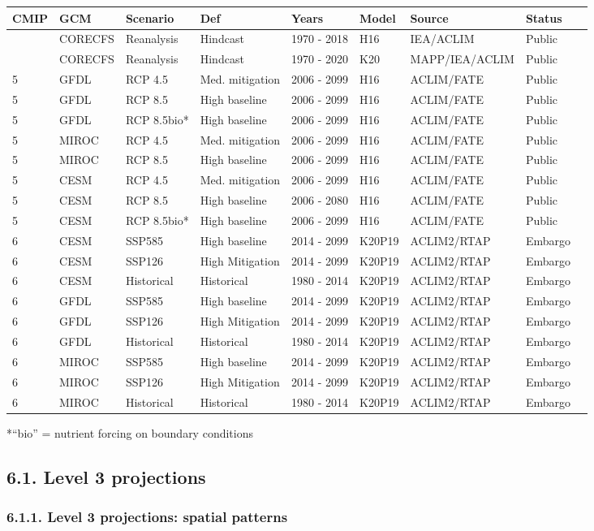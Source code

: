 \documentclass[
]{article}
\begin{document}
\begin{longtable}[]{@{}lllllllll@{}}
\toprule
CMIP & GCM & Scenario & Def & Years & Model & Source & Status
&\tabularnewline
\midrule
\endhead
& CORECFS & Reanalysis & Hindcast & 1970 - 2018 & H16 & IEA/ACLIM &
Public &\tabularnewline
& CORECFS & Reanalysis & Hindcast & 1970 - 2020 & K20 & MAPP/IEA/ACLIM &
Public &\tabularnewline
5 & GFDL & RCP 4.5 & Med. mitigation & 2006 - 2099 & H16 & ACLIM/FATE &
Public &\tabularnewline
5 & GFDL & RCP 8.5 & High baseline & 2006 - 2099 & H16 & ACLIM/FATE &
Public &\tabularnewline
5 & GFDL & RCP 8.5bio* & High baseline & 2006 - 2099 & H16 & ACLIM/FATE
& Public &\tabularnewline
5 & MIROC & RCP 4.5 & Med. mitigation & 2006 - 2099 & H16 & ACLIM/FATE &
Public &\tabularnewline
5 & MIROC & RCP 8.5 & High baseline & 2006 - 2099 & H16 & ACLIM/FATE &
Public &\tabularnewline
5 & CESM & RCP 4.5 & Med. mitigation & 2006 - 2099 & H16 & ACLIM/FATE &
Public &\tabularnewline
5 & CESM & RCP 8.5 & High baseline & 2006 - 2080 & H16 & ACLIM/FATE &
Public &\tabularnewline
5 & CESM & RCP 8.5bio* & High baseline & 2006 - 2099 & H16 & ACLIM/FATE
& Public &\tabularnewline
6 & CESM & SSP585 & High baseline & 2014 - 2099 & K20P19 & ACLIM2/RTAP &
Embargo &\tabularnewline
6 & CESM & SSP126 & High Mitigation & 2014 - 2099 & K20P19 & ACLIM2/RTAP
& Embargo &\tabularnewline
6 & CESM & Historical & Historical & 1980 - 2014 & K20P19 & ACLIM2/RTAP
& Embargo &\tabularnewline
6 & GFDL & SSP585 & High baseline & 2014 - 2099 & K20P19 & ACLIM2/RTAP &
Embargo &\tabularnewline
6 & GFDL & SSP126 & High Mitigation & 2014 - 2099 & K20P19 & ACLIM2/RTAP
& Embargo &\tabularnewline
6 & GFDL & Historical & Historical & 1980 - 2014 & K20P19 & ACLIM2/RTAP
& Embargo &\tabularnewline
6 & MIROC & SSP585 & High baseline & 2014 - 2099 & K20P19 & ACLIM2/RTAP
& Embargo &\tabularnewline
6 & MIROC & SSP126 & High Mitigation & 2014 - 2099 & K20P19 &
ACLIM2/RTAP & Embargo &\tabularnewline
6 & MIROC & Historical & Historical & 1980 - 2014 & K20P19 & ACLIM2/RTAP
& Embargo &\tabularnewline
\bottomrule
\end{longtable}

*``bio'' = nutrient forcing on boundary conditions

\hypertarget{level-3-projections}{%
\subsection{6.1. Level 3 projections}\label{level-3-projections}}

\hypertarget{level-3-projections-spatial-patterns}{%
\subsubsection{6.1.1. Level 3 projections: spatial
patterns}\label{level-3-projections-spatial-patterns}}
\end{document}

